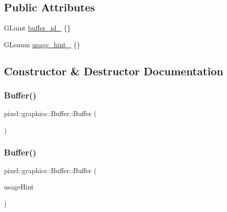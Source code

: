 \subsection*{Public Attributes}
\begin{DoxyCompactItemize}
\item 
G\+Luint \hyperlink{classpixel_1_1graphics_1_1_buffer_a3c9df71bba83b43e11784699cdc0d44a}{buffer\+\_\+id\+\_\+} \{\}
\item 
G\+Lenum \hyperlink{classpixel_1_1graphics_1_1_buffer_a8c1f22b44385b66d4b05a6f4d7f6a6ba}{usage\+\_\+hint\+\_\+} \{\}
\end{DoxyCompactItemize}


\subsection{Constructor \& Destructor Documentation}
\mbox{\label{classpixel_1_1graphics_1_1_buffer_a9fa35b1875e9c79e088587d23d6009c5}} 
\subsubsection{\texorpdfstring{Buffer()}{Buffer()}\hspace{0.1cm}{\footnotesize\ttfamily [1/2]}}
{\footnotesize\ttfamily pixel\+::graphics\+::\+Buffer\+::\+Buffer (\begin{DoxyParamCaption}{ }\end{DoxyParamCaption})}

\mbox{\label{classpixel_1_1graphics_1_1_buffer_aa1c31a950ba27ec02845463158760fc1}} 
\subsubsection{\texorpdfstring{Buffer()}{Buffer()}\hspace{0.1cm}{\footnotesize\ttfamily [2/2]}}
{\footnotesize\ttfamily pixel\+::graphics\+::\+Buffer\+::\+Buffer (\begin{DoxyParamCaption}\item[{G\+Lenum}]{usage\+Hint }\end{DoxyParamCaption})\hspace{0.3cm}{\ttfamily [explicit]}}



